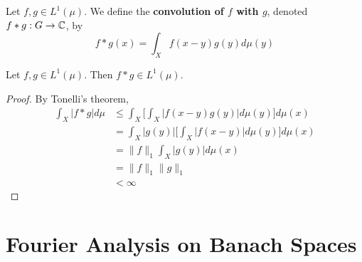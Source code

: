 \documentclass{book}
\begin{document}
	\begin{defn}  
	Let $f, g \in L^1(\mu)$. We define the \textbf{convolution of $f$ with $g$}, denoted $f * g: G \rightarrow \mathbb{C}$, by $$ f * g(x) = \int_X f(x-y)g(y) d\mu(y)$$
	\end{defn}
	
	\begin{ex}  
	Let $f, g \in L^1(\mu)$. Then $f * g \in L^1(\mu)$. 
	\end{ex}
	
	\begin{proof}
	By Tonelli's theorem, 
	\begin{align*}
	\int_X |f *g| d\mu 
	&\leq \int_X \bigg[  \int_X |f(x-y)g(y)| d\mu(y) \bigg] d\mu(x) \\
	&= \int_X |g(y)| \bigg[  \int_X |f(x-y)| d\mu(y) \bigg] d\mu(x) \\
	&=  \|f\|_1 \int_X |g(y)| d\mu(x) \\
	&= \|f\|_1 \|g\|_1\\
	& < \infty
	\end{align*}
	\end{proof}

























\newpage
\chapter{Fourier Analysis on Banach Spaces}
\end{document}
